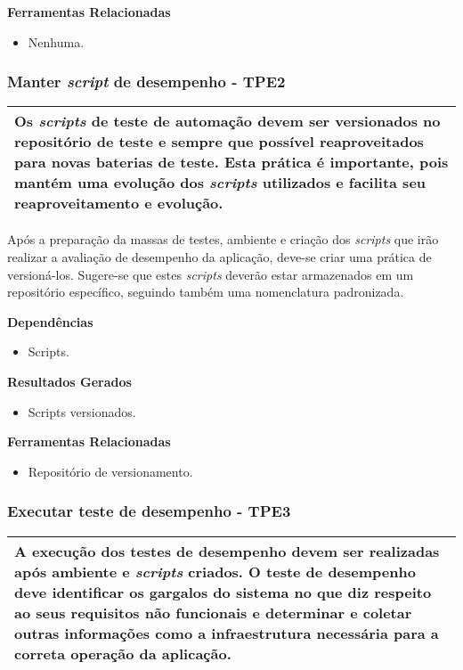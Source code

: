 \textbf{Ferramentas Relacionadas}
\begin{itemize}
    \item Nenhuma.
\end{itemize}

\subsubsection{Manter \textit{script} de desempenho - TPE2}
\label{sec:tpe2}

\begin{table}[H]
\centering
\begin{tabular}{|p{130mm}|}
\hline
Os \textit{scripts} de teste de automação devem ser versionados no repositório de teste e sempre que possível reaproveitados para novas baterias de teste. Esta prática é importante, pois mantém uma evolução dos \textit{scripts} utilizados e facilita seu reaproveitamento e evolução.\\ 
\hline
\end{tabular}
\end{table}

Após a preparação da massas de testes, ambiente e criação dos \textit{scripts} que irão realizar a avaliação de desempenho da aplicação, deve-se criar uma prática de versioná-los. Sugere-se que estes \textit{scripts} deverão estar armazenados em um repositório específico, seguindo também uma nomenclatura padronizada.

\textbf{Dependências}
\begin{itemize}
    \item Scripts.
\end{itemize}

\textbf{Resultados Gerados}
\begin{itemize}
    \item Scripts versionados.
\end{itemize}

\textbf{Ferramentas Relacionadas}
\begin{itemize}
    \item Repositório de versionamento.
\end{itemize}

\subsubsection{Executar teste de desempenho - TPE3}
\label{sec:tpe1}

\begin{table}[H]
\centering
\begin{tabular}{|p{130mm}|}
\hline
A execução dos testes de desempenho devem ser realizadas após ambiente e \textit{scripts} criados. O teste de desempenho deve identificar os gargalos do sistema no que diz respeito ao seus requisitos não funcionais e determinar e coletar outras informações como a infraestrutura necessária para a correta operação da aplicação.\\ 
\hline
\end{tabular}
\end{table}

